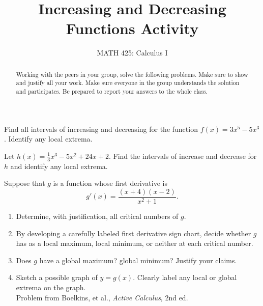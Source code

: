 \documentclass{ximera}
\title{Increasing and Decreasing Functions Activity}
\author{MATH 425: Calculus I}
\begin{document}
\begin{abstract}
   Working with the peers in your group, solve the following problems. Make sure to show and justify all your work. Make sure everyone in the group understands the solution and participates. Be prepared to report your answers to the whole class. 
\end{abstract}
\maketitle


\begin{exercise}
    Find all intervals of increasing and decreasing for the function $f(x)=3x^5-5x^3$.  Identify any local extrema.
\end{exercise}

\begin{exercise}
    Let $h(x)=\frac{1}{3}x^3-5x^2+24x+2$. Find the intervals of increase and decrease for $h$ and identify any local extrema.
\end{exercise}

\begin{exercise}
     Suppose that $g$ is a function whose first derivative is \[g'(x)=\frac{(x+4)(x-2)}{x^2+1}.\]
    \begin{enumerate}
        \item Determine, with justification, all critical numbers of $g$.
        \item  By developing a carefully labeled first derivative sign chart, decide whether $g$ has as a local maximum, local minimum, or neither at each critical number.
        \item Does $g$ have a global maximum? global minimum? Justify your claims.
        \item Sketch a possible graph of $y=g(x)$. Clearly label any local or global extrema on the graph.\\
    Problem from Boelkins, et al., \textit{Active Calculus}, 2nd ed.
    \end{enumerate}
\end{exercise}
\end{document}
